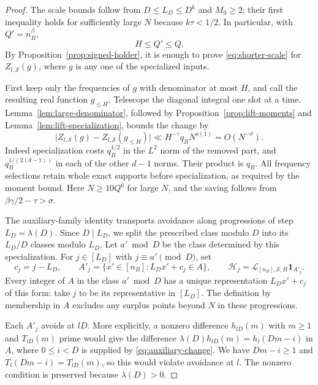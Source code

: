 \begin{proof}
The scale bounds follow from $D\le L_D\le D^k$ and $M_0\ge2$; their first
inequality holds for sufficiently large $N$ because $k\tau<1/2$.
In particular, with $Q'=n_B^\beta$,
\begin{equation}\label{eq:shorter-cutoffs}
 H\le Q'\le Q.
\end{equation}
By Proposition~\ref{prop:signed-holder}, it is enough to prove
\eqref{eq:shorter-scale} for $Z_{l,\mathcal S}(g)$, where $g$ is any one of
the specialized inputs.

First keep only the frequencies of $g$ with denominator at most $H$,
and call the resulting real function $g_{\le H}$.  Telescope the diagonal
integral one slot at a time.  Lemma~\ref{lem:large-denominator}, followed
by Proposition~\ref{prop:lift-moments} and
Lemma~\ref{lem:lift-specialization}, bounds the change by
\begin{equation}\label{eq:specialization-tail}
 \bigl|Z_{l,\mathcal S}(g)-Z_{l,\mathcal S}(g_{\le H})\bigr|
 \ll H^{-\gamma}q_BN^{o(1)}=O(N^{-\sigma}).
\end{equation}
Indeed specialization costs $q_B^{1/2}$ in the $L^2$ norm of the removed
part, and $q_B^{1/(2(d-1))}$ in each of the other $d-1$ norms.  Their
product is $q_B$.  All frequency selections retain whole exact supports
before specialization, as required by the moment bound.
Here $N\ge10Q^6$ for large $N$, and the saving follows from
$\beta\gamma/2-\tau>\sigma$.

The auxiliary-family identity transports avoidance along progressions
of step $L_D=\lambda(D)$.  Since $D\mid L_D$, we split the prescribed
class modulo $D$ into its $L_D/D$ classes modulo $L_D$.
Let $a'\bmod D$ be the class determined by this specialization.  For
$j\in[L_D]$ with $j\equiv a'\pmod D$, set
\[
 c_j=j-L_D,\qquad
 A'_j=\{x'\in[n_B]:L_Dx'+c_j\in A\},\qquad
 \mathcal H_j=\mathcal L_{[n_B],\mathcal S,H}\mathbf1_{A'_j}.
\]
Every integer of $A$ in the class $a'\bmod D$ has a unique representation
$L_Dx'+c_j$ of this form: take $j$ to be its representative in $[L_D]$.
The definition by membership in $A$ excludes any surplus points beyond
$N$ in these progressions.

Each $A'_j$ avoids at $lD$.  More explicitly, a nonzero difference
$h_{lD}(m)$ with $m\ge1$ and $T_{lD}(m)$ prime would give the difference
$\lambda(D)h_{lD}(m)=h_l(Dm-i)$ in $A$, where $0\le i<D$ is supplied by
\eqref{eq:auxiliary-change}.  We have $Dm-i\ge1$ and
$T_l(Dm-i)=T_{lD}(m)$, so this would violate avoidance at $l$.
The nonzero condition is preserved because $\lambda(D)>0$.


\end{proof}
